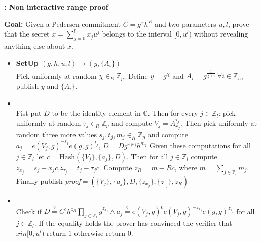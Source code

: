 \begin{algorithm}[]
\caption{\textbf{: Non interactive range proof}}
\textbf{Goal:} Given a Pedersen commitment $C=g^x h^R$ and two parameters $u,l$, prove that the secret $x=\sum_{j=0}^l x_j u^j$ belongs to the interval $[0,u^l)$ without revealing anything else about $x$.
\vspace{2pt}
\hline
\vspace{2pt}
\begin{itemize}
  \item\textbf{SetUp $(g,h,u,l)\xrightarrow[]{}(y,\{A_{i}\})$}\\
Pick uniformly at random $\chi\in_R\mathds{Z}_p$. Define $y=g^\chi$ and $A_i=g^{\frac{1}{\chi+i}} \: \forall i\in\mathds{Z}_u$, publish $y$ and $\{A_i\}$.

\item{}\\
Fist put $D$ to be the identity element in $\mathds{G}$. Then for every $j\in\mathds{Z}_l$: pick uniformly at random $\tau_j\in_R\mathds{Z}_p$ and compute $V_j=A_{x_j}^{\tau_j}$. Then pick uniformly at random three more values $s_j,t_j,m_j\in_R\mathds{Z}_p$ and compute $a_j=e(V_j,g)^{-s_j}e(g,g)^{t_j}$, $D=Dg^{x_js_j}h^{m_j}$ Given these computations for all $j\in\mathds{Z}_l$ let $c=\text{Hash}(\{V_j\},\{a_j\},D)$. Then for all $j\in\mathds{Z}_l$ compute $z_{x_j}=s_j-x_jc$,$z_{\tau_j}=t_j-\tau_jc$. Compute $z_R=m-Rc$, where $m=\sum_{j\in\mathds{Z}_l}m_j$. Finally publish \textit{proof}$=(\{V_j\},\{a_j\},D,\{z_{x_j}\},\{z_{\tau_j}\},z_R)$ 

\item{}\\
Check if $D\overset{?}{=}C^ch^{z_R}\prod_{j\in\mathds{Z}_l}g^{z_{x_j}}\wedge a_j \overset{?}{=} e(V_j,g)^c e(V_j,g)^{-z_{x_j}}e(g,g)^{z_{\tau_j}}$ for all $j\in\mathds{Z}_l$.  If the equality holds the prover has convinced the verifier that $xin [0,u^l)$ return $1$ otherwise return $0$.
\end{itemize}
\label{alg:ZKRP}
\end{algorithm}

